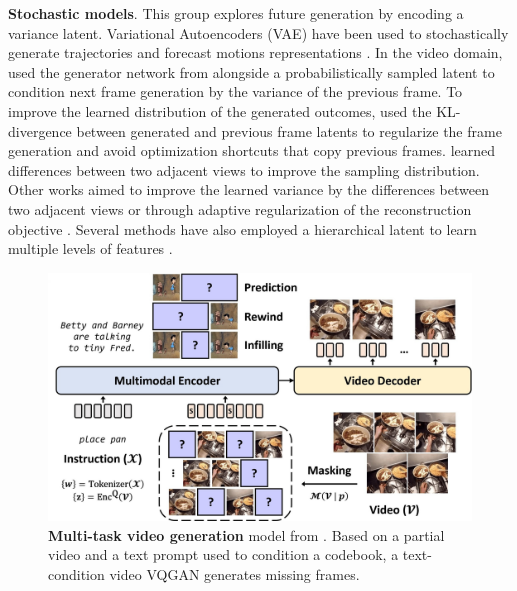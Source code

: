 \noindent
\textbf{Stochastic models}. This group explores future generation by encoding a variance latent. Variational Autoencoders (VAE) \citep{kingma2013auto} have been used to stochastically generate trajectories \citep{walker2016uncertain} and forecast motions representations \citep{fragkiadaki2017motion}. In the video domain,  \citet{babaeizadeh2018stochastic} used the generator network from \citet{finn2016unsupervised} alongside a probabilistically sampled latent to condition next frame generation by the variance of the previous frame. To improve the learned distribution of the generated outcomes, \citet{denton2018stochastic} used the KL-divergence between generated and previous frame latents to regularize the frame generation and avoid optimization shortcuts that copy previous frames. \citet{yan2018mt} learned differences between two adjacent views to improve the sampling distribution. Other works aimed to improve the learned variance by the differences between two adjacent views \citep{franceschi2020stochastic} or through adaptive regularization of the reconstruction objective \citep{chatterjee2021hierarchical}. Several methods have also employed a hierarchical latent to learn multiple levels of features \citep{castrejon2019improved,kumar2020videoflow,saxena2021clockwork}. 

\begin{figure}[t]
    \includegraphics[width=\linewidth]{figs/fig_mmvg.jpg}
    \caption{\textbf{Multi-task video generation} model from \citet{fu2023tell}. Based on a partial video and a text prompt used to condition a codebook, a text-condition video VQGAN generates missing frames.}
    \label{fig:mmvg}
\end{figure}


